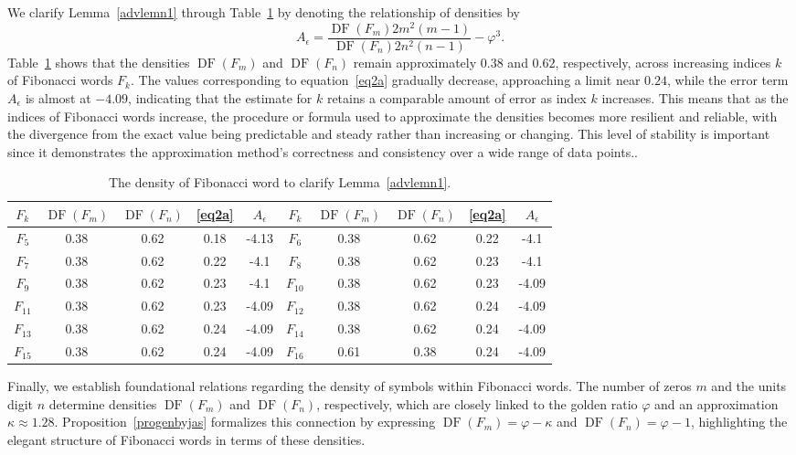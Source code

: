 \documentclass[11pt, a4paper]{article}
\newcommand{\DF}{\operatorname{DF}}
\theoremstyle{definition}
\begin{document}
We clarify Lemma~\ref{advlemn1} through Table~\ref{tab1advdensityfibwo} by denoting the relationship of densities by
\[
A_\epsilon = \frac{\DF(F_m) 2 m^2 (m - 1)}{\DF(F_n) 2 n^2 (n - 1)} - \varphi^3.
\]
Table~\ref{tab1advdensityfibwo} shows that the densities $\DF(F_m)$ and $\DF(F_n)$ remain approximately $0.38$ and $0.62$, respectively, across increasing indices $k$ of Fibonacci words $F_k$. The values corresponding to equation~\eqref{eq2a} gradually decrease, approaching a limit near $0.24$, while the error term $A_\epsilon$ is almost at $-4.09$,  indicating that the estimate for $k$ retains a comparable amount of error as index $k$ increases. This means that as the indices of Fibonacci words increase, the procedure or formula used to approximate the densities becomes more resilient and reliable, with the divergence from the exact value being predictable and steady rather than increasing or changing.  This level of stability is important since it demonstrates the approximation method's correctness and consistency over a wide range of data points..

\begin{table}[H]
    \centering
\begin{tabular}{|c|c|c|c|c||c|c|c|c|c|}
\hline
$F_k$ & $\DF(F_m)$ & $\DF(F_n)$ & \eqref{eq2a} & $A_\epsilon$  & $F_k$ & $\DF(F_m)$ & $\DF(F_n)$ & \eqref{eq2a} & $A_\epsilon$ \\
\hline
$F_5$ & 0.38 & 0.62 & 0.18 &  -4.13 & $F_6$ & 0.38 & 0.62 & 0.22 &  -4.1 \\ \hline
$F_7$ & 0.38 & 0.62 & 0.22 &  -4.1 & $F_8$ & 0.38 & 0.62 & 0.23 &  -4.1 \\ \hline
$F_9$ & 0.38 & 0.62 & 0.23 &  -4.1 & $F_{10}$ & 0.38 & 0.62 & 0.23 & -4.09 \\ \hline
$F_{11}$ & 0.38 & 0.62 & 0.23 &  -4.09 & $F_{12}$ & 0.38 & 0.62 & 0.24 &  -4.09 \\ \hline
$F_{13}$ & 0.38 & 0.62 & 0.24 &  -4.09 & $F_{14}$ & 0.38 & 0.62 & 0.24 &  -4.09 \\ \hline
$F_{15}$ & 0.38 & 0.62 & 0.24 &  -4.09 & $F_{16}$ & 0.61 & 0.38 & 0.24 &  -4.09 \\ \hline
\end{tabular}
\caption{The density of Fibonacci word to clarify Lemma~\ref{advlemn1}.}
\label{tab1advdensityfibwo}
\end{table}

Finally, we establish foundational relations regarding the density of symbols within Fibonacci words. The number of zeros $m$ and the units digit $n$ determine densities $\DF(F_m)$ and $\DF(F_n)$, respectively, which are closely linked to the golden ratio $\varphi$ and an approximation $\kappa \approx 1.28$. Proposition~\ref{progenbyjas} formalizes this connection by expressing $\DF(F_m) = \varphi - \kappa$ and $\DF(F_n) = \varphi - 1$, highlighting the elegant structure of Fibonacci words in terms of these densities.
\end{document}
